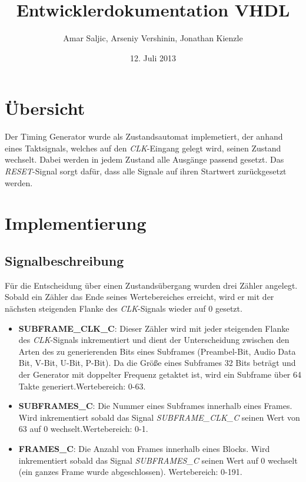 \documentclass[12pt,a4paper]{article}
\title{Entwicklerdokumentation VHDL}
\author{Amar Saljic, Arseniy Vershinin, Jonathan Kienzle}
\date{12. Juli 2013}
\begin{document}
\maketitle

\thispagestyle{fancy}

\section{Übersicht}

Der Timing Generator wurde als Zustandsautomat implemetiert, der anhand eines Taktsignals, welches auf den \emph{CLK}-Eingang gelegt wird, seinen Zustand wechselt. Dabei werden in jedem Zustand alle Ausgänge passend gesetzt. Das \emph{RESET}-Signal sorgt dafür, dass alle Signale auf ihren Startwert zurückgesetzt werden.

\section{Implementierung}

\subsection{Signalbeschreibung}

Für die Entscheidung über einen Zustandsübergang wurden drei Zähler angelegt. Sobald ein Zähler das Ende seines Wertebereiches erreicht, wird er mit der nächsten steigenden Flanke des \emph{CLK}-Signals wieder auf 0 gesetzt.

\begin{itemize}
\item {\bf SUBFRAME\_CLK\_C}: Dieser Zähler wird mit jeder steigenden Flanke des \emph{CLK}-Signals inkrementiert und dient der Unterscheidung zwischen den Arten des zu generierenden Bits eines Subframes (Preambel-Bit, Audio Data Bit, V-Bit, U-Bit, P-Bit). Da die Größe eines Subframes 32 Bits beträgt und der Generator mit doppelter Frequenz getaktet ist, wird ein Subframe über 64 Takte generiert.\newline Wertebereich: 0-63.
\item {\bf SUBFRAMES\_C}: Die Nummer eines Subframes innerhalb eines Frames. Wird inkrementiert sobald das Signal \emph{SUBFRAME\_CLK\_C} seinen Wert von 63 auf 0 wechselt.\newline Wertebereich: 0-1.
\item {\bf FRAMES\_C}: Die Anzahl von Frames innerhalb eines Blocks. Wird inkrementiert sobald das Signal \emph{SUBFRAMES\_C} seinen Wert auf 0 wechselt (ein ganzes Frame wurde abgeschlossen). \newline Wertebereich: 0-191. 
\end{itemize}
\end{document}
